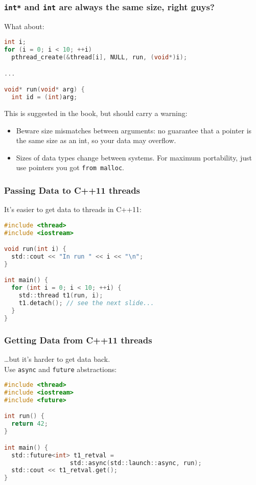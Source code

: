 \begin{frame}[fragile]
\frametitle{\texttt{int*} and \texttt{int} are always the same size, right guys?}

What about:
\begin{lstlisting}[language=C]
int i;
for (i = 0; i < 10; ++i)
  pthread_create(&thread[i], NULL, run, (void*)i);

...

void* run(void* arg) {
  int id = (int)arg;
\end{lstlisting}
  \vfill
  This is suggested in the book, but should carry a warning:

  \vfill
  \begin{itemize}
    \item<2-> Beware size mismatches between arguments: 
      no guarantee that a pointer is the same size as an int, so your data
      may overflow.
    \item<2-> Sizes of data types change between systems. For maximum
      portability, just use pointers you got {\tt from malloc}.
  \end{itemize}


\end{frame}

\begin{frame}[fragile]
  \frametitle{Passing Data to C++11 threads}

It's easier to get data to threads in C++11:
\begin{lstlisting}[language=C]
#include <thread>
#include <iostream>

void run(int i) {
  std::cout << "In run " << i << "\n";
}

int main() {
  for (int i = 0; i < 10; ++i) {
    std::thread t1(run, i);
    t1.detach(); // see the next slide...
  }
}
\end{lstlisting}

  
\end{frame}

\begin{frame}[fragile]
  \frametitle{Getting Data from C++11 threads}

    \ldots but it's harder to get data back.\\
    Use {\tt async} and {\tt future} abstractions:
    \begin{lstlisting}[language=C]
#include <thread>
#include <iostream>
#include <future>

int run() {
  return 42;
}

int main() {
  std::future<int> t1_retval =
                  std::async(std::launch::async, run);
  std::cout << t1_retval.get();
}
\end{lstlisting}

  
\end{frame}

